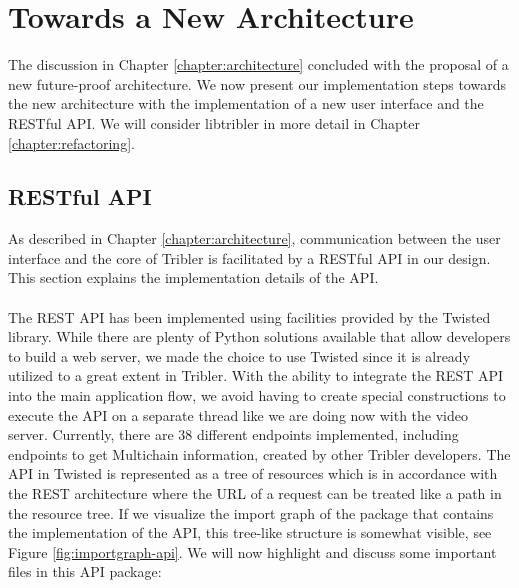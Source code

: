\chapter{Towards a New Architecture}
\label{chapter:towards-new-architecture}
The discussion in Chapter \ref{chapter:architecture} concluded with the proposal of a new future-proof architecture. We now present our implementation steps towards the new architecture with the implementation of a new user interface and the RESTful API. We will consider libtribler in more detail in Chapter \ref{chapter:refactoring}.

\section{RESTful API}
As described in Chapter \ref{chapter:architecture}, communication between the user interface and the core of Tribler is facilitated by a RESTful API in our design. This section explains the implementation details of the API.\\\\
The REST API has been implemented using facilities provided by the Twisted library. While there are plenty of Python solutions available that allow developers to build a web server, we made the choice to use Twisted since it is already utilized to a great extent in Tribler. With the ability to integrate the REST API into the main application flow, we avoid having to create special constructions to execute the API on a separate thread like we are doing now with the video server. Currently, there are 38 different endpoints implemented, including endpoints to get Multichain information, created by other Tribler developers. The API in Twisted is represented as a tree of resources which is in accordance with the REST architecture where the URL of a request can be treated like a path in the resource tree. If we visualize the import graph of the package that contains the implementation of the API, this tree-like structure is somewhat visible, see Figure \ref{fig:importgraph-api}. We will now highlight and discuss some important files in this API package:
